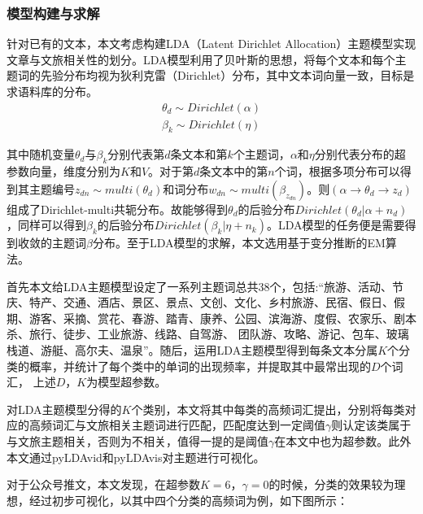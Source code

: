 \documentclass[bwprint]{gmcmthesis}
\begin{document}
\subsubsection{模型构建与求解}

针对已有的文本，本文考虑构建LDA（Latent Dirichlet Allocation）主题模型实现文章与文旅相关性的划分。LDA模型利用了贝叶斯的思想，将每个文本和每个主题词的先验分布均视为狄利克雷（Dirichlet）分布，其中文本词向量一致，目标是求语料库的分布。
\begin{gather}
	\theta_d \sim Dirichlet(\alpha) \\
	\beta_k \sim Dirichlet(\eta)
\end{gather}


其中随机变量$\theta_d$与$\beta_k$分别代表第$d$条文本和第$k$个主题词，$\alpha$和$\eta$分别代表分布的超参数向量，维度分别为$K$和$V$。对于第$d$条文本中的第$n$个词，根据多项分布可以得到其主题编号$z_{dn} \sim multi(\theta_d)$和词分布$w_{dn} \sim multi(\beta_{z_{dn}})$。则$(\alpha \rightarrow \theta_d \rightarrow z_d)$组成了Dirichlet-multi共轭分布。故能够得到$\theta_d$的后验分布$Dirichlet(\theta_d|\alpha + n_d)$，同样可以得到$\beta_k$的后验分布$Dirichlet(\beta_k|\eta + n_k)$。LDA模型的任务便是需要得到收敛的主题词$\beta$分布。至于LDA模型的求解，本文选用基于变分推断的EM算法。

首先本文给LDA主题模型设定了一系列主题词总共38个，包括:“旅游、活动、节庆、特产、交通、酒店、景区、景点、文创、文化、乡村旅游、民宿、假日、假期、游客、采摘、赏花、春游、踏青、康养、公园、滨海游、度假、农家乐、剧本杀、旅行、徒步、工业旅游、线路、自驾游、 团队游、攻略、游记、包车、玻璃栈道、游艇、高尔夫、温泉”。随后，运用LDA主题模型得到每条文本分属$K$个分类的概率，并统计了每个类中的单词的出现频率，并提取其中最常出现的$D$个词汇， 上述$D$，$K$为模型超参数。

对LDA主题模型分得的$K$个类别，本文将其中每类的高频词汇提出，分别将每类对应的高频词汇与文旅相关主题词进行匹配，匹配度达到一定阈值$\gamma$则认定该类属于与文旅主题相关，否则为不相关，值得一提的是阈值$\gamma$在本文中也为超参数。此外本文通过pyLDAvid和pyLDAvis对主题进行可视化。



对于公众号推文，本文发现，在超参数$K=6$，$\gamma=0$的时候，分类的效果较为理想，经过初步可视化，以其中四个分类的高频词为例，如下图所示：
\end{document}
